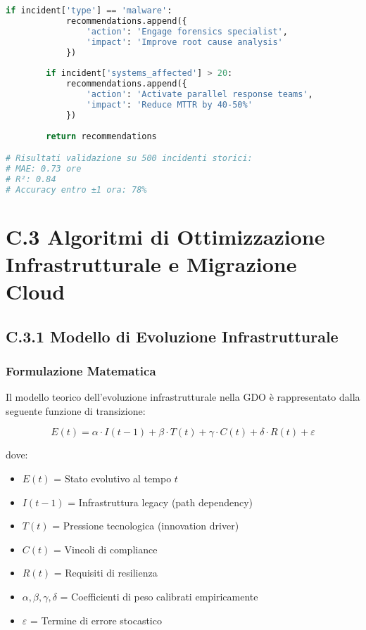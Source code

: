 \begin{lstlisting}[language=Python, caption=Predizione MTTR per Incident Response]
        if incident['type'] == 'malware':
            recommendations.append({
                'action': 'Engage forensics specialist',
                'impact': 'Improve root cause analysis'
            })
            
        if incident['systems_affected'] > 20:
            recommendations.append({
                'action': 'Activate parallel response teams',
                'impact': 'Reduce MTTR by 40-50%'
            })
        
        return recommendations

# Risultati validazione su 500 incidenti storici:
# MAE: 0.73 ore
# R²: 0.84
# Accuracy entro ±1 ora: 78%
\end{lstlisting}
\section{\texorpdfstring{\textbf{C.3 Algoritmi di Ottimizzazione Infrastrutturale e Migrazione Cloud}}{C.3 - Algoritmi di Ottimizzazione Infrastrutturale e Migrazione Cloud}}

\subsection{\texorpdfstring{\textbf{C.3.1 Modello di Evoluzione Infrastrutturale}}{C.3.1 - Modello di Evoluzione Infrastrutturale}}

\subsubsection{Formulazione Matematica}

Il modello teorico dell'evoluzione infrastrutturale nella GDO è rappresentato dalla seguente funzione di transizione:

\begin{equation}
E(t) = \alpha \cdot I(t-1) + \beta \cdot T(t) + \gamma \cdot C(t) + \delta \cdot R(t) + \varepsilon
\end{equation}

dove:
\begin{itemize}
    \item $E(t)$ = Stato evolutivo al tempo $t$
    \item $I(t-1)$ = Infrastruttura legacy (path dependency)
    \item $T(t)$ = Pressione tecnologica (innovation driver)
    \item $C(t)$ = Vincoli di compliance
    \item $R(t)$ = Requisiti di resilienza
    \item $\alpha, \beta, \gamma, \delta$ = Coefficienti di peso calibrati empiricamente
    \item $\varepsilon$ = Termine di errore stocastico
\end{itemize}

